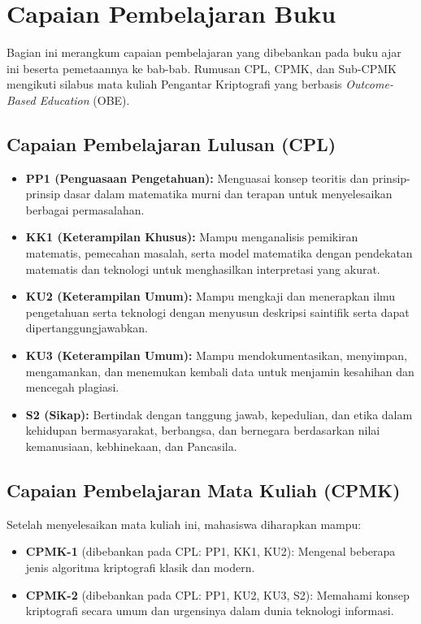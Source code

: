 \documentclass[../main.tex]{subfiles}
\begin{document}
\chapter*{Capaian Pembelajaran Buku}

Bagian ini merangkum capaian pembelajaran yang dibebankan pada buku ajar ini
beserta pemetaannya ke bab-bab. Rumusan CPL, CPMK, dan Sub-CPMK mengikuti
silabus mata kuliah Pengantar Kriptografi yang berbasis
\textit{Outcome-Based Education} (OBE).

\section*{Capaian Pembelajaran Lulusan (CPL)}

\begin{itemize}
    \item \textbf{PP1 (Penguasaan Pengetahuan):} Menguasai konsep teoritis dan
          prinsip-prinsip dasar dalam matematika murni dan terapan untuk
          menyelesaikan berbagai permasalahan.
    \item \textbf{KK1 (Keterampilan Khusus):} Mampu menganalisis pemikiran
          matematis, pemecahan masalah, serta model matematika dengan pendekatan
          matematis dan teknologi untuk menghasilkan interpretasi yang akurat.
    \item \textbf{KU2 (Keterampilan Umum):} Mampu mengkaji dan menerapkan ilmu
          pengetahuan serta teknologi dengan menyusun deskripsi saintifik serta
          dapat dipertanggungjawabkan.
    \item \textbf{KU3 (Keterampilan Umum):} Mampu mendokumentasikan, menyimpan,
          mengamankan, dan menemukan kembali data untuk menjamin kesahihan dan
          mencegah plagiasi.
    \item \textbf{S2 (Sikap):} Bertindak dengan tanggung jawab, kepedulian, dan
          etika dalam kehidupan bermasyarakat, berbangsa, dan bernegara
          berdasarkan nilai kemanusiaan, kebhinekaan, dan Pancasila.
\end{itemize}

\section*{Capaian Pembelajaran Mata Kuliah (CPMK)}

Setelah menyelesaikan mata kuliah ini, mahasiswa diharapkan mampu:

\begin{itemize}
    \item \textbf{CPMK-1} (dibebankan pada CPL: PP1, KK1, KU2): Mengenal
          beberapa jenis algoritma kriptografi klasik dan modern.
    \item \textbf{CPMK-2} (dibebankan pada CPL: PP1, KU2, KU3, S2): Memahami
          konsep kriptografi secara umum dan urgensinya dalam dunia teknologi
          informasi.
\end{itemize}
\end{document}

